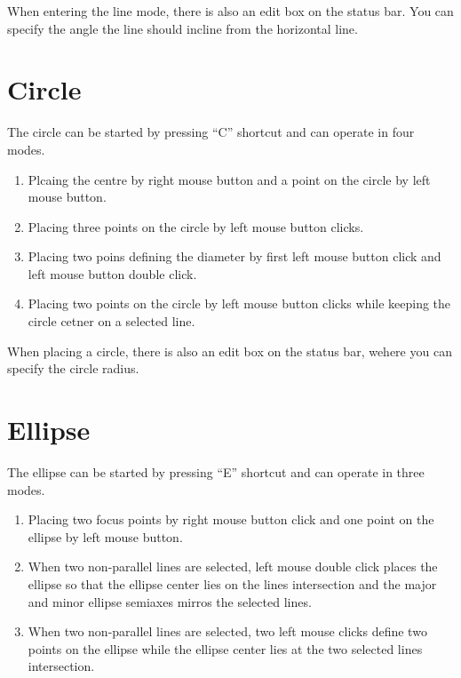 When entering the line mode, there is also an edit box on the status bar. You can
specify the angle the line should incline from the horizontal line.

\section{Circle}

The circle can be started by pressing ``C'' shortcut and can operate in four modes.
\begin{enumerate}
\item Plcaing the centre by right mouse button and a point on the circle by left
mouse button.
\item Placing three points on the circle by left mouse button clicks.
\item Placing two poins defining the diameter by first left mouse button click and
left mouse button double click.
\item Placing two points on the circle by left mouse button clicks while keeping
the circle cetner on a selected line.
\end{enumerate}

When placing a circle, there is also an edit box on the status bar, wehere you can
specify the circle radius.

\section{Ellipse}

The ellipse can be started by pressing ``E'' shortcut and can operate in three modes.
\begin{enumerate}
\item Placing two focus points by right mouse button click and one point on the ellipse
by left mouse button.
\item When two non-parallel lines are selected, left mouse double click places the ellipse
so that the ellipse center lies on the lines intersection and the major and minor ellipse
semiaxes mirros the selected lines.
\item When two non-parallel lines are selected, two left mouse clicks define two points
on the ellipse while the ellipse center lies at the two selected lines intersection.
\end{enumerate}

